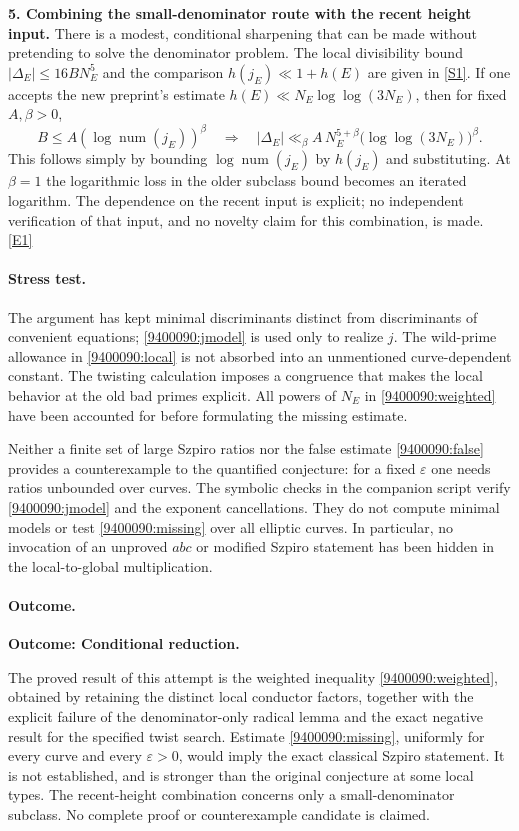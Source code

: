 \documentclass[11pt,a4paper]{article}
\newcommand{\sref}[2]{\hyperlink{source:#1:#2}{[S#2]}}
\newcommand{\eref}[2]{\hyperlink{extra:#1:#2}{[E#2]}}
\numberwithin{equation}{section}
\begin{document}
\medskip
\textbf{5. Combining the small-denominator route with the recent height input.}
There is a modest, conditional sharpening that can be made without pretending
to solve the denominator problem. The local divisibility bound
$|\Delta_E|\leq16 B N_E^5$ and the comparison
$h(j_E)\ll1+h(E)$ are given in \sref{9400090}{1}.
If one accepts the new preprint's estimate
$h(E)\ll N_E\log\log(3N_E)$, then for fixed $A,\beta>0$,
\[
 B\leq A(\log\operatorname{num}(j_E))^\beta
 \quad\Longrightarrow\quad
 |\Delta_E|\ll_\beta A\,
 N_E^{5+\beta}\bigl(\log\log(3N_E)\bigr)^\beta.
\]
This follows simply by bounding $\log\operatorname{num}(j_E)$ by $h(j_E)$
and substituting. At $\beta=1$ the logarithmic loss in the older subclass
bound becomes an iterated logarithm. The dependence on the recent input is
explicit; no independent verification of that input, and no novelty claim
for this combination, is made. \eref{9400090}{1}

\paragraph{Stress test.}
The argument has kept minimal discriminants distinct from discriminants of
convenient equations; \eqref{9400090:jmodel} is used only to realize $j$.
The wild-prime allowance in \eqref{9400090:local} is not absorbed into an
unmentioned curve-dependent constant. The twisting calculation imposes a
congruence that makes the local behavior at the old bad primes explicit.
All powers of $N_E$ in \eqref{9400090:weighted} have been accounted for before
formulating the missing estimate.

Neither a finite set of large Szpiro ratios nor the false estimate
\eqref{9400090:false} provides a counterexample to the quantified conjecture:
for a fixed $\varepsilon$ one needs ratios unbounded over curves. The symbolic
checks in the companion script verify \eqref{9400090:jmodel} and the exponent
cancellations. They do not compute minimal models or test
\eqref{9400090:missing} over all elliptic curves. In particular, no invocation
of an unproved $abc$ or modified Szpiro statement has been hidden in the
local-to-global multiplication.

\paragraph{Outcome.}
\textbf{Outcome: Conditional reduction.}

The proved result of this attempt is the weighted inequality
\eqref{9400090:weighted}, obtained by retaining the distinct local conductor
factors, together with the explicit failure of the denominator-only radical
lemma and the exact negative result for the specified twist search.
Estimate \eqref{9400090:missing}, uniformly for every curve and every
$\varepsilon>0$, would imply the exact classical Szpiro statement. It is
not established, and is stronger than the original conjecture at some local
types. The recent-height combination concerns only a small-denominator
subclass. No complete proof or counterexample candidate is claimed.
\end{document}
